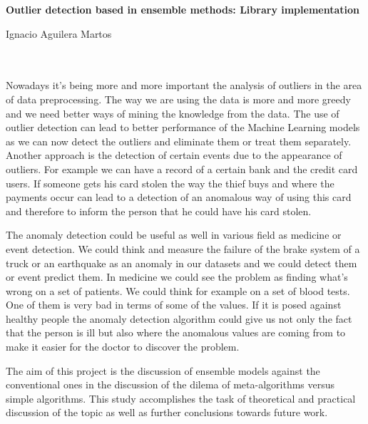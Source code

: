 \cleardoublepage


\thispagestyle{empty}


\begin{center}
{\large\bfseries Outlier detection based in ensemble methods: Library implementation}\\
\end{center}
\begin{center}
Ignacio Aguilera Martos\\
\end{center}

\\

\vspace{0.7cm}
\\

Nowadays it's being more and more important the analysis of outliers in the area of data preprocessing. The way we are using the data is more and more greedy and we need better ways of mining the knowledge from the data. The use of outlier detection can lead to better performance of the Machine Learning models as we can now detect the outliers and eliminate them or treat them separately. Another approach is the detection of certain events due to the appearance of outliers. For example we can have a record of a certain bank and the credit card users. If someone gets his card stolen the way the thief buys and where the payments occur can lead to a detection of an anomalous way of using this card and therefore to inform the person that he could have his card stolen.

The anomaly detection could be useful as well in various field as medicine or event detection. We could think and measure the failure of the brake system of a truck or an earthquake as an anomaly in our datasets and we could detect them or event predict them. In medicine we could see the problem as finding what's wrong on a set of patients. We could think for example on a set of blood tests. One of them is very bad in terms of some of the values. If it is posed against healthy people the anomaly detection algorithm could give us not only the fact that the person is ill but also where the anomalous values are coming from to make it easier for the doctor to discover the problem.

The aim of this project is the discussion of ensemble models against the conventional ones in the discussion of the dilema of meta-algorithms versus simple algorithms. This study accomplishes the task of theoretical and practical discussion of the topic as well as further conclusions towards future work.

